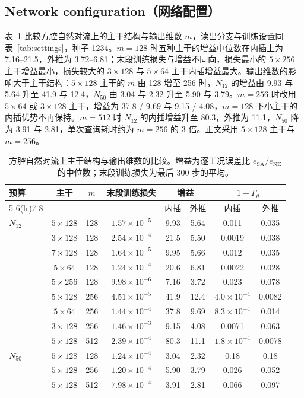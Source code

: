 \subsection{Network configuration（网络配置）}
\label{app:network}

表~\ref{tab:network_config} 比较方腔自然对流上的主干结构与输出维数 $m$，读出分支与训练设置同表~\ref{tab:settings}，种子 1234。$m=128$ 时五种主干的增益中位数在内插上为 7.16--21.5，外推为 3.72--6.81；末段训练损失与增益不同向，损失最小的 $5\times256$ 主干增益最小，损失较大的 $3\times128$ 与 $5\times64$ 主干内插增益最大。输出维数的影响大于主干结构：$5\times128$ 主干的 $m$ 由 128 增至 256 时，$N_{12}$ 的增益由 9.93 与 5.64 升至 41.9 与 12.4，$N_{50}$ 由 3.04 与 2.32 升至 5.90 与 3.79。$m=256$ 时改用 $5\times64$ 或 $3\times128$ 主干，增益为 37.8 / 9.69 与 9.15 / 4.08，$m=128$ 下小主干的内插优势不再保持。$m=512$ 时 $N_{12}$ 的内插增益升至 80.3，外推为 11.1，$N_{50}$ 降为 3.91 与 2.81，单次查询耗时约为 $m=256$ 的 3 倍。正文采用 $5\times128$ 主干与 $m=256$。

\begin{table}[H]
\centering
\caption{方腔自然对流上主干结构与输出维数的比较。增益为逐工况误差比 $e_{\mathrm{SA}}/e_{\mathrm{NE}}$ 的中位数；末段训练损失为最后 300 步的平均。}
\label{tab:network_config}
\small
\begin{tabular}{lccccccc}
\toprule
预算 & 主干 & $m$ & 末段训练损失 & \multicolumn{2}{c}{增益} & \multicolumn{2}{c}{$1-\Gamma_\theta$} \\
\cmidrule(lr){5-6}\cmidrule(lr){7-8}
 & & & & 内插 & 外推 & 内插 & 外推 \\
\midrule
$N_{12}$ & $5\times128$ & 128 & $1.57\times10^{-5}$ & 9.93 & 5.64 & 0.011 & 0.035 \\
 & $3\times128$ & 128 & $2.54\times10^{-4}$ & 21.5 & 5.50 & 0.0019 & 0.038 \\
 & $7\times128$ & 128 & $1.64\times10^{-5}$ & 9.95 & 5.66 & 0.012 & 0.035 \\
 & $5\times64$ & 128 & $1.24\times10^{-4}$ & 20.6 & 6.81 & 0.0022 & 0.028 \\
 & $5\times256$ & 128 & $9.98\times10^{-6}$ & 7.16 & 3.72 & 0.023 & 0.078 \\
 & $5\times128$ & 256 & $4.51\times10^{-5}$ & 41.9 & 12.4 & $4.0\times10^{-4}$ & 0.0082 \\
 & $5\times64$ & 256 & $1.44\times10^{-4}$ & 37.8 & 9.69 & $8.3\times10^{-4}$ & 0.014 \\
 & $3\times128$ & 256 & $1.46\times10^{-3}$ & 9.15 & 4.08 & 0.0071 & 0.063 \\
 & $5\times128$ & 512 & $2.39\times10^{-4}$ & 80.3 & 11.1 & $1.8\times10^{-4}$ & 0.0078 \\
\midrule
$N_{50}$ & $5\times128$ & 128 & $1.24\times10^{-4}$ & 3.04 & 2.32 & 0.18 & 0.18 \\
 & $5\times128$ & 256 & $1.20\times10^{-4}$ & 5.90 & 3.79 & 0.026 & 0.052 \\
 & $5\times128$ & 512 & $7.98\times10^{-4}$ & 3.91 & 2.81 & 0.066 & 0.097 \\
\bottomrule
\end{tabular}
\end{table}

